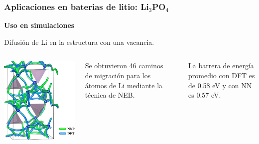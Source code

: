 \documentclass[aspectratio=169]{beamer}
\let\oldtextbf\textbf
\renewcommand{\textbf}[1]{\textcolor{nordblue}{\oldtextbf{#1}}}
\begin{document}
    \begin{frame}
        \frametitle{Aplicaciones en baterias de litio: Li$_3$PO$_4$}
            
        \textbf{Uso en simulaciones}

        Difusión de Li en la estructura con una vacancia.
        
        \begin{columns}
            \begin{center}
                \includegraphics[width=\columnwidth]{Li3PO4-neb.png}
            \end{center}

            Se obtuvieron 46 caminos de migración para los átomos de Li mediante
            la técnica de NEB.

            \ \pause

            La barrera de energía promedio con DFT es de 0.58 eV y con NN es 
            0.57 eV.
        \end{columns}

    \end{frame}
    
\end{document}
